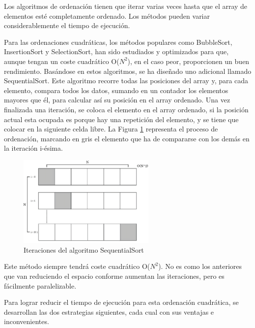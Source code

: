 		
	
	Los algoritmos de ordenación tienen que iterar varias veces hasta que el array de elementos esté completamente ordenado. Los métodos pueden variar considerablemente el tiempo de ejecución.
	

	
	Para las ordenaciones cuadráticas, los métodos populares como BubbleSort, InsertionSort y SelectionSort, han sido estudiados y optimizados para que, aunque tengan un coste cuadrático O(\(N^{2}\)), en el caso peor, proporcionen un buen rendimiento. Basándose en estos algoritmos, se ha diseñado uno adicional llamado SequentialSort. Este algoritmo recorre todas las posiciones del array y, para cada elemento, compara todos los datos, sumando en un contador los elementos mayores que él, para calcular así su posición en el array ordenado. Una vez finalizada una iteración, se coloca el elemento en el array ordenado, si la posición actual esta ocupada es porque hay una repetición del elemento, y se tiene que colocar en la siguiente celda libre. La Figura \ref{fig:sequentialsortmpi} representa el proceso de ordenación, marcando en gris el elemento que ha de compararse con los demás en la iteración i-ésima.
	
	\begin{figure}[!h]
		\centering
		\includegraphics[width=0.6\textwidth]{images/chapter_3/sequentialsort_mpi}
		\caption{Iteraciones del algoritmo SequentialSort}
		\label{fig:sequentialsortmpi}
	\end{figure}
	
	Este método siempre tendrá coste cuadrático O(\(N^{2}\)). No es como los anteriores que van reduciendo el espacio conforme aumentan las iteraciones, pero es fácilmente paralelizable. 
	
	Para lograr reducir el tiempo de ejecución para esta ordenación cuadrática, se desarrollan las dos estrategias siguientes, cada cual con sus ventajas e inconvenientes.
	
